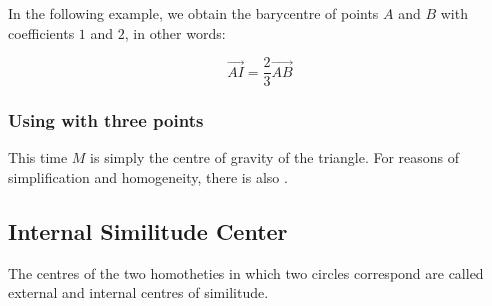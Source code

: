 In the following example, we obtain the barycentre of points $A$ and $B$ with
coefficients $1$ and $2$, in other words:

\[
  \overrightarrow{AI}= \frac{2}{3}\overrightarrow{AB}
\]

\begin{tkzexample}[latex=7cm,small]
\end{tkzexample}

\subsubsection{Using  with three points}

This time $M$ is simply the centre of gravity of the triangle. For reasons of
simplification and homogeneity, there is also .

\begin{tkzexample}[latex=7cm,small]
\end{tkzexample}

\subsection{Internal Similitude Center}

The centres of the two homotheties in which two circles correspond are called
external and internal centres of similitude.

